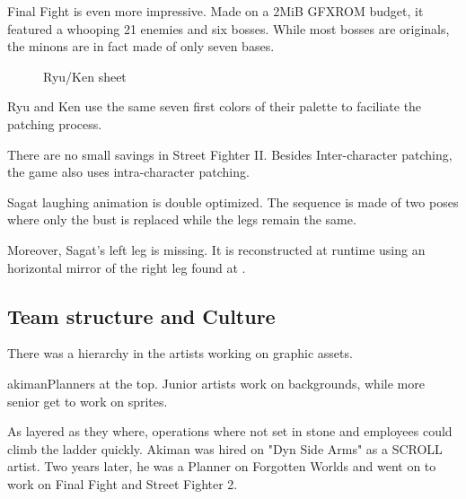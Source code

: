 Final Fight is even more impressive. Made on a 2MiB GFXROM budget, it featured a whooping 21 enemies and six bosses. While most bosses are originals, the minons are in fact made of only seven bases.

\begin{minipage}[t]{0.29\linewidth}
\end{minipage}
\hfill%
\begin{minipage}[t]{0.29\linewidth}
\end{minipage}
\hfill%
\begin{minipage}[t]{0.29\linewidth}
\end{minipage}

 \begin{figure}[H]
\caption*{Ryu/Ken sheet}
\end{figure}

Ryu and Ken use the same seven first colors of their palette to faciliate the patching process. 








There are no small savings in Street Fighter II. Besides Inter-character patching, the game also uses intra-character patching.  

Sagat laughing animation is double optimized. The sequence is made of two poses where only the bust is replaced while the legs remain the same.

Moreover, Sagat's left leg is missing. It is reconstructed at runtime using an horizontal mirror of the right leg found at .


\pagebreak

\subsection{Team structure and Culture}

There was a hierarchy in the artists working on graphic assets. 

\begin{q}{akiman\cite{akiman2003}}Planners at the top. Junior artists work on backgrounds, while more senior get to work on sprites.
\end{q}

As layered as they where, operations where not set in stone and employees could climb the ladder quickly. Akiman was hired on "Dyn Side Arms" as a SCROLL artist. Two years later, he was a Planner on Forgotten Worlds and went on to work on Final Fight and Street Fighter 2.

